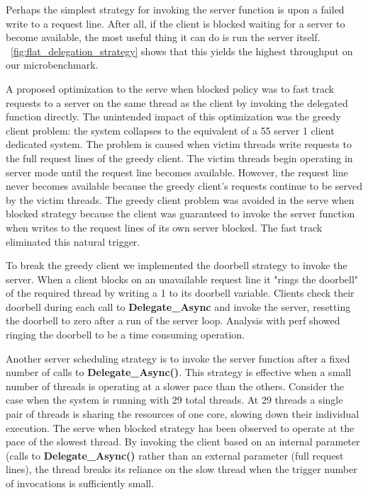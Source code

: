 \documentclass{uicthesi}
\newcounter{problem}
\begin{document}
Perhaps the simplest strategy for invoking the server function is upon a failed write to a request line. After all, if the client is blocked waiting for a server to become available, the most useful thing it can do is run the server itself. ~\ref{fig:flat_delegation_strategy} shows that this yields the highest throughput on our microbenchmark. 

A proposed optimization to the serve when blocked policy was to fast track requests to a server on the same thread as the client by invoking the delegated function directly. The unintended impact of this optimization was the greedy client problem: the system collapses to the equivalent of a 55 server 1 client dedicated system. The problem is caused when victim threads write requests to the full request lines of the greedy client. The victim threads begin operating in server mode until the request line becomes available. However, the request line never becomes available because the greedy client's requests continue to be served by the victim threads. The greedy client problem was avoided in the serve when blocked strategy because the client was guaranteed to invoke the server function when writes to the request lines of its own server blocked. The fast track eliminated this natural trigger. 

To break the greedy client we implemented the doorbell strategy to invoke the server. When a client blocks on an unavailable request line it "rings the doorbell" of the required thread by writing a 1 to its doorbell variable. Clients check their doorbell during each call to \textbf{Delegate\_Async} and invoke the server, resetting the doorbell to zero after a run of the server loop. Analysis with perf showed ringing the doorbell to be a time consuming operation. 

Another server scheduling strategy is to invoke the server function after a fixed number of calls to \textbf{Delegate\_Async()}. This strategy is effective when a small number of threads is operating at a slower pace than the others. Consider the case when the system is running with 29 total threads. At 29 threads a single pair of threads is sharing the resources of one core, slowing down their individual execution. The serve when blocked strategy has been observed to operate at the pace of the slowest thread. By invoking the client based on an internal parameter (calls to \textbf{Delegate\_Async()} rather than an external parameter (full request lines), the thread breaks its reliance on the slow thread when the trigger number of invocations is sufficiently small. 
\end{document}
